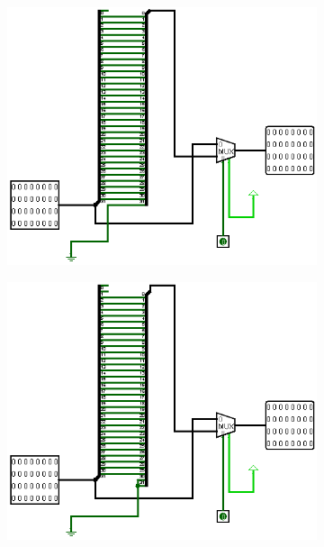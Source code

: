 \documentclass[a4paper,12pt]{article}
\begin{document}
\begin{figure}[H]
    \begin{subfigure}[b]{0.3\textwidth}
        \centering
        \includegraphics[width=\linewidth]{1 bit rightShifter.png}
    \end{subfigure}
    \hfill
    \begin{subfigure}[b]{0.3\textwidth}
        \centering
        \includegraphics[width=\linewidth]{2 bit righShifter.png}
    \end{subfigure}

\end{figure}
\end{document}
